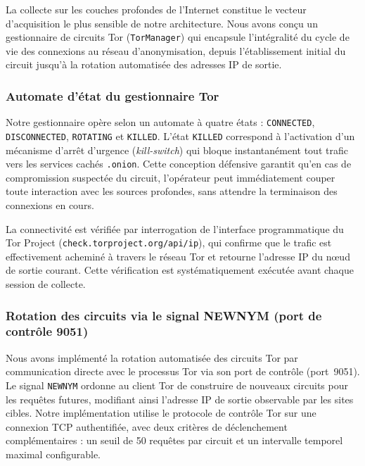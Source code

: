 La collecte sur les couches profondes de l'Internet constitue le vecteur d'acquisition le plus sensible de notre architecture. Nous avons conçu un gestionnaire de circuits Tor (\texttt{TorManager}) qui encapsule l'intégralité du cycle de vie des connexions au réseau d'anonymisation, depuis l'établissement initial du circuit jusqu'à la rotation automatisée des adresses IP de sortie.

\subsubsection{Automate d'état du gestionnaire Tor}

Notre gestionnaire opère selon un automate à quatre états : \texttt{CONNECTED}, \texttt{DISCONNECTED}, \texttt{ROTATING} et \texttt{KILLED}. L'état \texttt{KILLED} correspond à l'activation d'un mécanisme d'arrêt d'urgence (\textit{kill-switch}) qui bloque instantanément tout trafic vers les services cachés \texttt{.onion}. Cette conception défensive garantit qu'en cas de compromission suspectée du circuit, l'opérateur peut immédiatement couper toute interaction avec les sources profondes, sans attendre la terminaison des connexions en cours.

La connectivité est vérifiée par interrogation de l'interface programmatique du Tor Project (\texttt{check.torproject.org/api/ip}), qui confirme que le trafic est effectivement acheminé à travers le réseau Tor et retourne l'adresse IP du n\oe ud de sortie courant. Cette vérification est systématiquement exécutée avant chaque session de collecte.

\subsubsection{Rotation des circuits via le signal NEWNYM (port de contrôle 9051)}

Nous avons implémenté la rotation automatisée des circuits Tor par communication directe avec le processus Tor via son port de contrôle (port~9051). Le signal \texttt{NEWNYM} ordonne au client Tor de construire de nouveaux circuits pour les requêtes futures, modifiant ainsi l'adresse IP de sortie observable par les sites cibles. Notre implémentation utilise le protocole de contrôle Tor sur une connexion TCP authentifiée, avec deux critères de déclenchement complémentaires : un seuil de 50 requêtes par circuit et un intervalle temporel maximal configurable.

